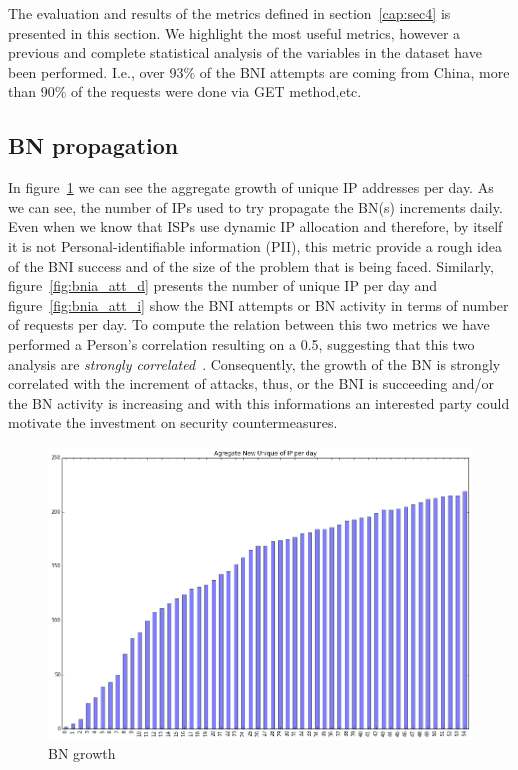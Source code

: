 
The evaluation and results of the metrics defined in section~\ref{cap:sec4} is presented in this section. We highlight the most useful metrics, however a previous and complete statistical analysis of the variables in the dataset have been performed. I.e., over 93\% of the BNI attempts are coming from China, more than 90\% of the requests were done via GET method,etc.

\subsection{BN propagation}
In figure~\ref{fig:agg_grow} we can see the aggregate growth of unique IP addresses per day. As we can see, the number of IPs used to try propagate the BN(s) increments daily. Even when we know that ISPs use dynamic IP allocation and therefore, by itself it is not Personal-identifiable information (PII), this metric provide a rough idea of the BNI success and of the size of the problem that is being faced.
Similarly, figure~\ref{fig:bnia_att_d} presents the number of unique IP per day and figure~\ref{fig:bnia_att_i} show the BNI attempts or BN activity in terms of number of requests per day. To compute the relation between this two metrics we have performed a Person's correlation resulting on a 0.5, suggesting that this two analysis are \textit{strongly correlated}~\cite{pear_corr}. Consequently, the growth of the BN is strongly correlated with the increment of attacks, thus, or the BNI is succeeding and/or the BN activity is increasing and with this informations an interested party could motivate the investment on security countermeasures.

\begin{figure}[h]
    \caption{BN growth}
    \label{fig:agg_grow}
    \centering
    \includegraphics[width=\linewidth]{images/a_new_ip_da}
\end{figure}


